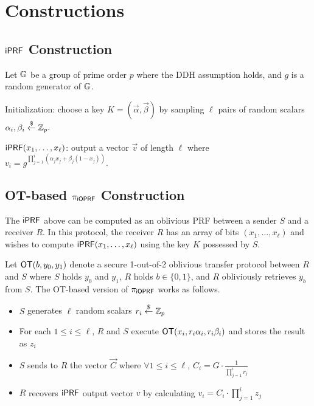 \section{Constructions}
\subsection{$\mathsf{i}\mathsf{PRF}$ Construction}
Let $\mathbb{G}$ be a group of prime order $p$ where the DDH assumption holds,
and $g$ is a random generator of $\mathbb{G}$.

Initialization: choose a key $K=(\vec{{\alpha}},\vec{\beta})$ by sampling
$\ell$ pairs of random scalars
${\alpha_{i}},{\beta_{i}}\stackrel{\$}{\leftarrow}\mathbb{Z}_p.$

$\mathsf{i}\mathsf{PRF}(x_1,\ldots,x_\ell)$: output a vector $\vec{v}$ of length $\ell$ where $v_i = g^{\prod_{j=1}^{i} (\alpha_jx_j+\beta_j(1-x_j))}.$





\subsection{OT-based ${\pi_{\mathsf{i}\mathsf{OPRF}}}$ Construction}

The $\mathsf{i}\mathsf{PRF}$ above can be computed as an oblivious PRF between a sender $S$ and a receiver $R$.  In this protocol,
the receiver $R$ has an array of bits $(x_1, \ldots, x_\ell)$ and wishes to compute $\mathsf{i}\mathsf{PRF}(x_1, \ldots, x_\ell)$ using
the key $K$ possessed by $S$.

Let $\mathsf{OT}(b, y_0, y_1)$ denote a secure 1-out-of-2 oblivious transfer protocol between $R$ and $S$ where
$S$ holds $y_0$ and $y_1$, $R$ holds $b\in\{0,1\}$, and $R$ obliviously retrieves $y_b$ from $S$.  The OT-based version of ${\pi_{\mathsf{i}\mathsf{OPRF}}}$ works as follows.

\begin{itemize}
\item $S$ generates $\ell$ random scalars $r_i\stackrel{\$}{\leftarrow}\mathbb{Z}_p$
\item For each $1 \leq i \leq \ell$, $R$ and $S$ execute $\mathsf{OT}(x_i, r_i\alpha_i, r_i\beta_i)$ and stores the result as $z_i$
\item $S$ sends to $R$ the vector $\vec{C}$ where $\forall 1 \leq i \leq \ell$, $C_i =  G \cdot \frac{1}{\prod_{j=1}^{i} r_j}$
\item $R$ recovers $\mathsf{i}\mathsf{PRF}$ output vector $v$ by calculating $v_i = C_i \cdot \prod_{j=1}^{i} z_j$
\end{itemize}


